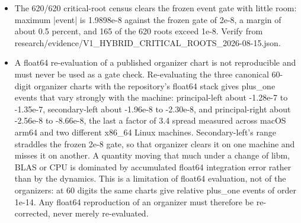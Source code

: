 \begin{itemize}
\item The 620/620 critical-root census clears the frozen event gate with little room: maximum |event| is 1.9898e-8 against the frozen gate of 2e-8, a margin of about 0.5 percent, and 165 of the 620 roots exceed 1e-8. Verify from research/evidence/V1\_HYBRID\_CRITICAL\_ROOTS\_2026-08-15.json.
\item A float64 re-evaluation of a published organizer chart is not reproducible and must never be used as a gate check. Re-evaluating the three canonical 60-digit organizer charts with the repository's float64 stack gives plus\_one events that vary strongly with the machine: principal-left about -1.28e-7 to -1.35e-7, secondary-left about -1.96e-8 to -2.30e-8, and principal-right about -2.56e-8 to -8.66e-8, the last a factor of 3.4 spread measured across macOS arm64 and two different x86\_64 Linux machines. Secondary-left's range straddles the frozen 2e-8 gate, so that organizer clears it on one machine and misses it on another. A quantity moving that much under a change of libm, BLAS or CPU is dominated by accumulated float64 integration error rather than by the dynamics. This is a limitation of float64 evaluation, not of the organizers: at 60 digits the same charts give relative plus\_one events of order 1e-14. Any float64 reproduction of an organizer must therefore be re-corrected, never merely re-evaluated.

\end{itemize}
